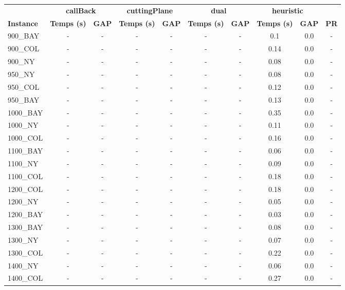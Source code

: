 \documentclass[main.tex]{subfiles}
\begin{document}
\begin{center}
\renewcommand{\arraystretch}{1.4} 
 \begin{tabular}{lccccccccc}
	\hline
 & \multicolumn{2}{c}{\textbf{callBack}} & \multicolumn{2}{c}{\textbf{cuttingPlane}} & \multicolumn{2}{c}{\textbf{dual}} & \multicolumn{2}{c}{\textbf{heuristic}}\\
\textbf{Instance}  & \textbf{Temps (s)} & \textbf{GAP} & \textbf{Temps (s)} & \textbf{GAP} & \textbf{Temps (s)} & \textbf{GAP} & \textbf{Temps (s)} & \textbf{GAP} & \textbf{PR} \\\hline

900\_BAY & - & - 
 & - & - 
 & - & - 
 & 0.1 & 0.0 & - \\
900\_COL & - & - 
 & - & - 
 & - & - 
 & 0.14 & 0.0 & - \\
900\_NY & - & - 
 & - & - 
 & - & - 
 & 0.08 & 0.0 & - \\
950\_NY & - & - 
 & - & - 
 & - & - 
 & 0.08 & 0.0 & - \\
950\_COL & - & - 
 & - & - 
 & - & - 
 & 0.12 & 0.0 & - \\
950\_BAY & - & - 
 & - & - 
 & - & - 
 & 0.13 & 0.0 & - \\
1000\_BAY & - & - 
 & - & - 
 & - & - 
 & 0.35 & 0.0 & - \\
1000\_NY & - & - 
 & - & - 
 & - & - 
 & 0.11 & 0.0 & - \\
1000\_COL & - & - 
 & - & - 
 & - & - 
 & 0.16 & 0.0 & - \\
1100\_BAY & - & - 
 & - & - 
 & - & - 
 & 0.06 & 0.0 & - \\
1100\_NY & - & - 
 & - & - 
 & - & - 
 & 0.09 & 0.0 & - \\
1100\_COL & - & - 
 & - & - 
 & - & - 
 & 0.18 & 0.0 & - \\
1200\_COL & - & - 
 & - & - 
 & - & - 
 & 0.18 & 0.0 & - \\
1200\_NY & - & - 
 & - & - 
 & - & - 
 & 0.05 & 0.0 & - \\
1200\_BAY & - & - 
 & - & - 
 & - & - 
 & 0.03 & 0.0 & - \\
1300\_BAY & - & - 
 & - & - 
 & - & - 
 & 0.08 & 0.0 & - \\
1300\_NY & - & - 
 & - & - 
 & - & - 
 & 0.07 & 0.0 & - \\
1300\_COL & - & - 
 & - & - 
 & - & - 
 & 0.22 & 0.0 & - \\
1400\_NY & - & - 
 & - & - 
 & - & - 
 & 0.06 & 0.0 & - \\
1400\_COL & - & - 
 & - & - 
 & - & - 
 & 0.27 & 0.0 & - \\

\end{tabular}
\end{center}
\end{document}
